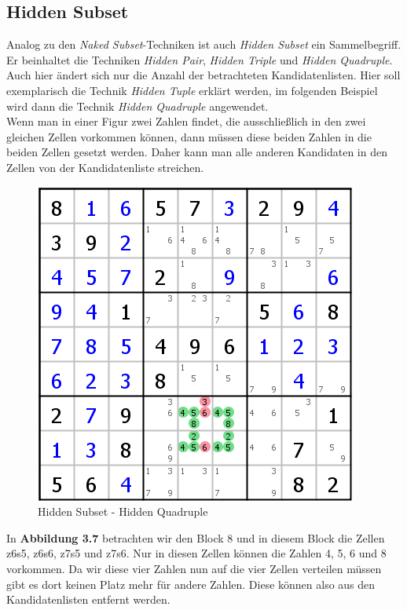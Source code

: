 \newpage
\subsection{Hidden Subset}
Analog zu den \textit{Naked Subset}-Techniken ist auch \textit{Hidden Subset} ein Sammelbegriff. Er beinhaltet die Techniken \textit{Hidden Pair}, \textit{Hidden Triple} und \textit{Hidden Quadruple}. Auch hier ändert sich nur die Anzahl der betrachteten Kandidatenlisten. Hier soll exemplarisch die Technik \textit{Hidden Tuple} erklärt werden, im folgenden Beispiel wird dann die Technik \textit{Hidden Quadruple} angewendet.\\
Wenn man in einer Figur zwei Zahlen findet, die ausschließlich in den zwei gleichen Zellen vorkommen können, dann müssen diese beiden Zahlen in die beiden Zellen gesetzt werden. Daher kann man alle anderen Kandidaten in den Zellen von der Kandidatenliste streichen.

\begin{figure}[h]
\begin{center}
\includegraphics{./img/hidden_subset.png}
\caption{Hidden Subset - Hidden Quadruple}
\end{center}
\end{figure}

In \textbf{Abbildung 3.7} betrachten wir den Block 8 und in diesem Block die Zellen z6s5, z6s6, z7s5 und z7s6. Nur in diesen Zellen können die Zahlen 4, 5, 6 und 8 vorkommen. Da wir diese vier Zahlen nun auf die vier Zellen verteilen müssen gibt es dort keinen Platz mehr für andere Zahlen. Diese können also aus den Kandidatenlisten entfernt werden.
